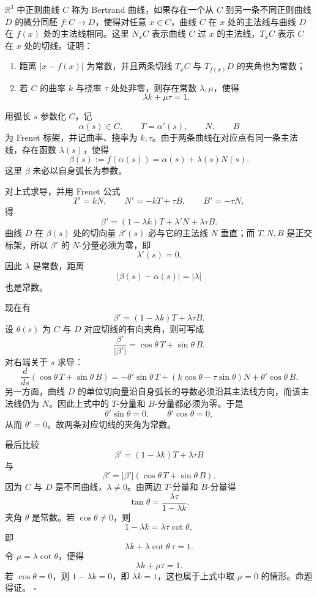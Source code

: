 \documentclass[UTF8,12pt]{ctexart}
\newcommand{\R}{\mathbb R}
\newcounter{problem}
\newenvironment{problem}[1][]{%
  \refstepcounter{problem}
  \par\bigskip
  \noindent{\large\bfseries 题目 \theproblem\if\relax\detokenize{#1}\relax\else\quad #1\fi}\par
  \smallskip
  \noindent\ignorespaces
}{\par}
\newenvironment{solution}{%
  \par\medskip
  \noindent{\bfseries 解答}\quad\ignorespaces
}{\hfill$\square$\par\medskip}
\begin{document}
\begin{problem}
\(\R^3\) 中正则曲线 \(C\) 称为 Bertrand 曲线，如果存在一个从 \(C\) 到另一条不同正则曲线 \(D\) 的微分同胚 \(f:C\to D\)，使得对任意 \(x\in C\)，曲线 \(C\) 在 \(x\) 处的主法线与曲线 \(D\) 在 \(f(x)\) 处的主法线相同。这里 \(N_xC\) 表示曲线 \(C\) 过 \(x\) 的主法线，\(T_xC\) 表示 \(C\) 在 \(x\) 处的切线。证明：
\begin{enumerate}[label=(\alph*)]
\item 距离 \(|x-f(x)|\) 为常数，并且两条切线 \(T_xC\) 与 \(T_{f(x)}D\) 的夹角也为常数；
\item 若 \(C\) 的曲率 \(k\) 与挠率 \(\tau\) 处处非零，则存在常数 \(\lambda,\mu\)，使得
\[
\lambda k+\mu\tau=1.
\]
\end{enumerate}
\end{problem}

\begin{solution}
用弧长 \(s\) 参数化 \(C\)，记
\[
\alpha(s)\in C,\qquad T=\alpha'(s),\qquad N,\qquad B
\]
为 Frenet 标架，并记曲率、挠率为 \(k,\tau\)。由于两条曲线在对应点有同一条主法线，存在函数 \(\lambda(s)\)，使得
\[
\beta(s):=f(\alpha(s))=\alpha(s)+\lambda(s)N(s).
\]
这里 \(\beta\) 未必以自身弧长为参数。

对上式求导，并用 Frenet 公式
\[
T'=kN,\qquad N'=-kT+\tau B,\qquad B'=-\tau N,
\]
得
\[
\beta'
=(1-\lambda k)T+\lambda' N+\lambda\tau B.
\]
曲线 \(D\) 在 \(\beta(s)\) 处的切向量 \(\beta'(s)\) 必与它的主法线 \(N\) 垂直；而 \(T,N,B\) 是正交标架，所以 \(\beta'\) 的 \(N\)-分量必须为零，即
\[
\lambda'(s)=0.
\]
因此 \(\lambda\) 是常数，距离
\[
|\beta(s)-\alpha(s)|=|\lambda|
\]
也是常数。

现在有
\[
\beta'=(1-\lambda k)T+\lambda\tau B.
\]
设 \(\theta(s)\) 为 \(C\) 与 \(D\) 对应切线的有向夹角，则可写成
\[
\frac{\beta'}{|\beta'|}
=\cos\theta\,T+\sin\theta\,B.
\]
对右端关于 \(s\) 求导：
\[
\frac{d}{ds}(\cos\theta\,T+\sin\theta\,B)
=-\theta'\sin\theta\,T+(k\cos\theta-\tau\sin\theta)N+\theta'\cos\theta\,B.
\]
另一方面，曲线 \(D\) 的单位切向量沿自身弧长的导数必须沿其主法线方向，而该主法线仍为 \(N\)。因此上式中的 \(T\)-分量和 \(B\)-分量都必须为零。于是
\[
\theta'\sin\theta=0,\qquad \theta'\cos\theta=0,
\]
从而 \(\theta'=0\)。故两条对应切线的夹角为常数。

最后比较
\[
\beta'=(1-\lambda k)T+\lambda\tau B
\]
与
\[
\beta'=|\beta'|(\cos\theta\,T+\sin\theta\,B).
\]
因为 \(C\) 与 \(D\) 是不同曲线，\(\lambda\ne0\)。由两边 \(T\)-分量和 \(B\)-分量得
\[
\tan\theta=\frac{\lambda\tau}{1-\lambda k}.
\]
夹角 \(\theta\) 是常数。若 \(\cos\theta\ne0\)，则
\[
1-\lambda k=\lambda\tau\cot\theta,
\]
即
\[
\lambda k+\lambda\cot\theta\,\tau=1.
\]
令 \(\mu=\lambda\cot\theta\)，便得
\[
\lambda k+\mu\tau=1.
\]
若 \(\cos\theta=0\)，则 \(1-\lambda k=0\)，即 \(\lambda k=1\)，这也属于上式中取 \(\mu=0\) 的情形。命题得证。
\end{solution}
\end{document}
